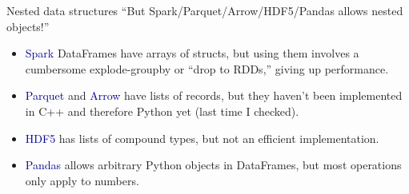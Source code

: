 \documentclass[aspectratio=169]{beamer}
\begin{document}
\begin{frame}{Nested data structures}
\large
\vspace{0.5 cm}
{\Large ``But Spark/Parquet/Arrow/HDF5/Pandas allows nested objects!''}

\vspace{0.5 cm}

\vspace{0.25 cm}
\begin{itemize}\setlength{\itemsep}{0.25 cm}
\item<3-> \textcolor{darkblue}{Spark} DataFrames have arrays of structs, but using them involves a cumbersome explode-groupby or ``drop to RDDs,'' giving up performance.
\item<4-> \textcolor{darkblue}{Parquet} and \textcolor{darkblue}{Arrow} have lists of records, but they haven't been implemented in C++ and therefore Python yet (last time I checked).
\item<5-> \textcolor{darkblue}{HDF5} has lists of compound types, but not an efficient implementation.
\item<6-> \textcolor{darkblue}{Pandas} allows arbitrary Python objects in DataFrames, but most operations only apply to numbers.
\end{itemize}
\end{frame}
\end{document}
